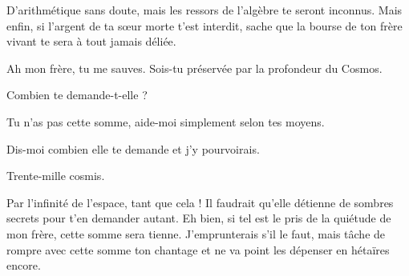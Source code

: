 \begin{drama}
  \elenaspeaks D’arithmétique sans doute, mais les ressors de l’algèbre te seront inconnus. Mais enfin, si l’argent de ta sœur morte t’est interdit, sache que la bourse de ton frère vivant te sera à tout jamais déliée.

  \vladimirspeaks Ah mon frère, tu me sauves. Sois-tu préservée par la profondeur du Cosmos.

  \elenaspeaks Combien te demande-t-elle ?

  \vladimirspeaks Tu n’as pas cette somme, aide-moi simplement selon tes moyens.

  \elenaspeaks Dis-moi combien elle te demande et j’y pourvoirais.

  \vladimirspeaks Trente-mille cosmis.

  \elenaspeaks Par l’infinité de l’espace, tant que cela ! Il faudrait qu’elle détienne de sombres secrets pour t’en demander autant. Eh bien, si tel est le pris de la quiétude de mon frère, cette somme sera tienne. J’emprunterais s’il le faut, mais tâche de rompre avec cette somme ton chantage et ne va point les dépenser en hétaïres encore.
\end{drama}

\scene

\StageDirII{\elena, \alexas}

